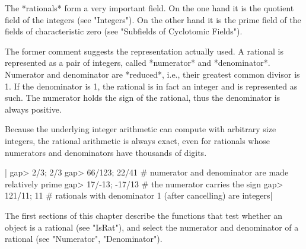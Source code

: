 %

The *rationals*  form  a very important field.  On the one hand it is the
quotient field of the integers (see "Integers").  On the other hand it is
the prime field of the fields of characteristic zero  (see "Subfields  of
Cyclotomic Fields").

The former comment suggests the representation actually used.  A rational
is  represented   as   a   pair   of  integers,  called  *numerator*  and
*denominator*.   Numerator  and  denominator are  *reduced*, i.e.,  their
greatest common divisor is 1.  If  the denominator  is 1, the rational is
in fact an integer and is represented as such.   The numerator holds  the
sign of the rational, thus the denominator is always positive.

Because the underlying integer arithmetic can compute with arbitrary size
integers, the  rational arithmetic is  always  exact, even  for rationals
whose numerators and denominators have thousands of digits.

|    gap> 2/3;
    2/3
    gap> 66/123;
    22/41    # numerator and denominator are made relatively prime
    gap> 17/-13;
    -17/13    # the numerator carries the sign
    gap> 121/11;
    11    # rationals with denominator 1 (after cancelling) are integers|

The first sections of  this chapter  describe  the  functions  that  test
whether an object  is a rational (see "IsRat"), and select the  numerator
and denominator of a rational (see "Numerator", "Denominator").

